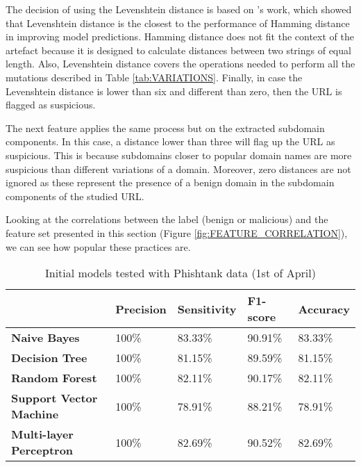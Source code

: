 The decision of using the Levenshtein distance is based on \cite{Mouad_Zouina}'s work, which showed that Levenshtein distance is the closest to the performance of Hamming distance in improving model predictions. Hamming distance does not fit the context of the artefact because it is designed to calculate distances between two strings of equal length. Also, Levenshtein distance covers the operations needed to perform all the mutations described in Table \ref{tab:VARIATIONS}. Finally, in case the Levenshtein distance is lower than six and different than zero, then the URL is flagged as suspicious.

The next feature applies the same process but on the extracted subdomain components. In this case, a distance lower than three will flag up the URL as suspicious. This is because subdomains closer to popular domain names are more suspicious than different variations of a domain. Moreover, zero distances are not ignored as these represent the presence of a benign domain in the subdomain components of the studied URL.

Looking at the correlations between the label (benign or malicious) and the feature set presented in this section (Figure \ref{fig:FEATURE_CORRELATION}), we can see how popular these practices are.

\begin{singlespace}
	\begin{table}[t]
		\begin{center}
			\begin{tabular}{  m{13em}  m{5em}  m{5em}  m{5em}  m{5em}  } \toprule

				                                & \textbf{Precision} & \textbf{Sensitivity} & \textbf{F1-score} & \textbf{Accuracy} \\ \midrule

				\textbf{Naive Bayes}            & 100\%              & 83.33\%              & 90.91\%           & 83.33\%           \\

				\textbf{Decision Tree}          & 100\%              & 81.15\%              & 89.59\%           & 81.15\%           \\

				\textbf{Random Forest}          & 100\%              & 82.11\%              & 90.17\%           & 82.11\%           \\

				\textbf{Support Vector Machine} & 100\%              & 78.91\%              & 88.21\%           & 78.91\%           \\

				\textbf{Multi-layer Perceptron} & 100\%              & 82.69\%              & 90.52\%           & 82.69\%           \\ \bottomrule
			\end{tabular}
			\captionsetup{type=table}\caption{Initial models tested with Phishtank data (1st of April)}
			\label{tab:PERFORMANCE_ASSESSMENT}
		\end{center}
	\end{table}
\end{singlespace}

